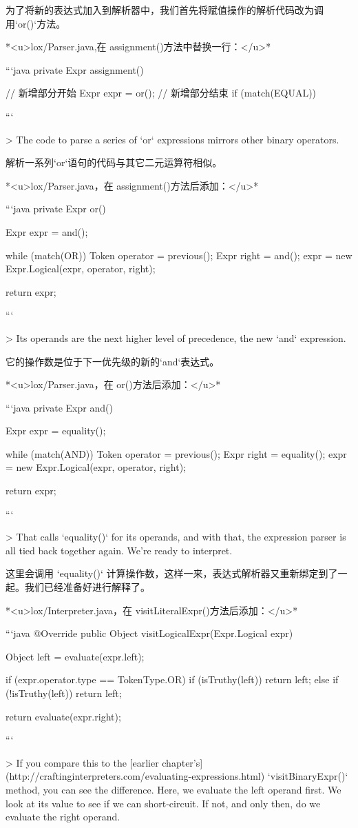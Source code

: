 \documentclass[cn,11pt,chinese]{elegantbook}
\begin{document}
{{为了将新的表达式加入到解析器中，我们首先将赋值操作的解析代码改为调用`or()`方法。

*<u>lox/Parser.java,在 assignment()方法中替换一行：</u>*

```java
  private Expr assignment() {
    // 新增部分开始
    Expr expr = or();
    // 新增部分结束
    if (match(EQUAL)) {
```

> The code to parse a series of `or` expressions mirrors other binary operators.

解析一系列`or`语句的代码与其它二元运算符相似。

*<u>lox/Parser.java，在 assignment()方法后添加：</u>*

```java
  private Expr or() {
    Expr expr = and();

    while (match(OR)) {
      Token operator = previous();
      Expr right = and();
      expr = new Expr.Logical(expr, operator, right);
    }

    return expr;
  }
```

> Its operands are the next higher level of precedence, the new `and` expression.

它的操作数是位于下一优先级的新的`and`表达式。

*<u>lox/Parser.java，在 or()方法后添加：</u>*

```java
  private Expr and() {
    Expr expr = equality();

    while (match(AND)) {
      Token operator = previous();
      Expr right = equality();
      expr = new Expr.Logical(expr, operator, right);
    }

    return expr;
  }
```

> That calls `equality()` for its operands, and with that, the expression parser is all tied back together again. We’re ready to interpret.

这里会调用 `equality()` 计算操作数，这样一来，表达式解析器又重新绑定到了一起。我们已经准备好进行解释了。

*<u>lox/Interpreter.java，在 visitLiteralExpr()方法后添加：</u>*

```java
  @Override
  public Object visitLogicalExpr(Expr.Logical expr) {
    Object left = evaluate(expr.left);

    if (expr.operator.type == TokenType.OR) {
      if (isTruthy(left)) return left;
    } else {
      if (!isTruthy(left)) return left;
    }

    return evaluate(expr.right);
  }
```

> If you compare this to the [earlier chapter’s](http://craftinginterpreters.com/evaluating-expressions.html) `visitBinaryExpr()` method, you can see the difference. Here, we evaluate the left operand first. We look at its value to see if we can short-circuit. If not, and only then, do we evaluate the right operand.

}}}}
\end{document}
